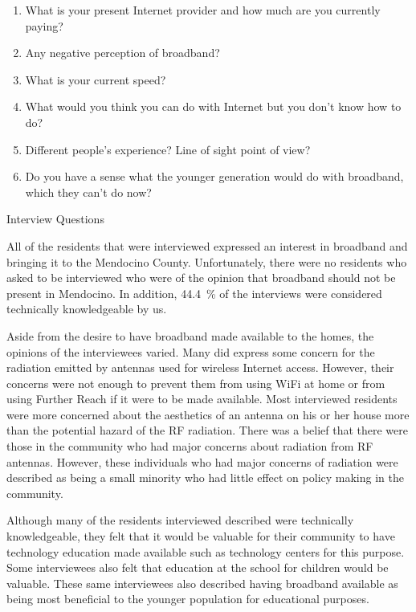 \begin{table}
\begin{enumerate}
    \item What is your present Internet provider and how much are you currently paying?
    \item Any negative perception of broadband?
    \item What is your current speed?
    \item What would you think you can do with Internet but you don’t know how to do?
    \item Different people’s experience? Line of sight point of view?
    \item Do you have a sense what the younger generation would do with broadband, which they can’t do now?
\end{enumerate}
\caption{Interview Questions}
\label{tab:questions} 
\end{table}

All of the residents that were interviewed expressed an interest in broadband and bringing it
to the Mendocino County. Unfortunately, there were no residents who asked to be interviewed who 
were of the opinion that broadband should not be present in Mendocino. In addition, 44.4~\% of
the interviews were considered technically knowledgeable by us.

Aside from the desire to have broadband made available to the homes, the opinions of the 
interviewees varied. Many did express some concern for the radiation emitted by antennas
used for wireless Internet access. However, their concerns were not enough to prevent them
from using WiFi at home or from using Further Reach if it were to be made available.
Most interviewed residents were more concerned about the aesthetics of an antenna on his or her
house more than the potential hazard of the RF radiation.
There was a belief that there were those in the community who had major concerns about radiation
from RF antennas. However, these individuals who had major concerns of radiation were described
as being a small minority who had little effect on policy making in the community.

Although many of the residents interviewed described were technically knowledgeable, they felt
that it would be valuable for their community to have technology education made available such
as technology centers for this purpose. Some interviewees also felt that education at the school
for children would be valuable. These same interviewees also described having broadband available
as being most beneficial to the younger population for educational purposes.

